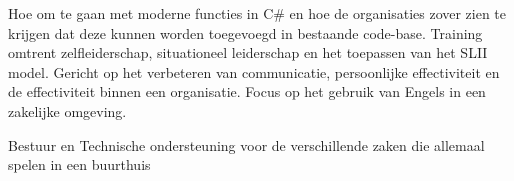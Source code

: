 \documentclass[
	a4paper
]{babelviscv}
\begin{document}
	\begin{cvtable}[1.5]
			{Hoe om te gaan met moderne functies in C\# en hoe de organisaties zover zien te krijgen dat deze kunnen worden toegevoegd in bestaande code-base.}
			{Training omtrent zelfleiderschap, situationeel leiderschap en het toepassen van het SLII model.}
			{Gericht op het verbeteren van communicatie, persoonlijke effectiviteit en de effectiviteit binnen een organisatie.}
			{Focus op het gebruik van Engels in een zakelijke omgeving.}
	\end{cvtable}

		\begin{cvtable}[1.5]
				{Bestuur en Technische ondersteuning voor de verschillende zaken die allemaal spelen in een buurthuis}
		\end{cvtable}


\cvsignature
\end{document}
